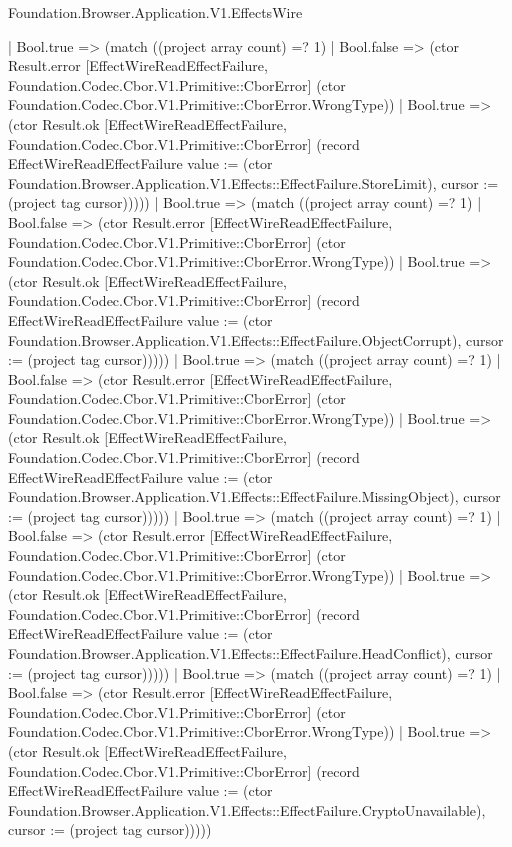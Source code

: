 \begin{lexlean}{Foundation.Browser.Application.V1.EffectsWire}
\begin{semanticmodule}
{                    | Bool.true => (match ((project array count) =? 1)
                      | Bool.false => (ctor Result.error [EffectWireReadEffectFailure, Foundation.Codec.Cbor.V1.Primitive::CborError] (ctor Foundation.Codec.Cbor.V1.Primitive::CborError.WrongType))
                      | Bool.true => (ctor Result.ok [EffectWireReadEffectFailure, Foundation.Codec.Cbor.V1.Primitive::CborError] (record EffectWireReadEffectFailure {value := (ctor Foundation.Browser.Application.V1.Effects::EffectFailure.StoreLimit), cursor := (project tag cursor)}))))
                  | Bool.true => (match ((project array count) =? 1)
                    | Bool.false => (ctor Result.error [EffectWireReadEffectFailure, Foundation.Codec.Cbor.V1.Primitive::CborError] (ctor Foundation.Codec.Cbor.V1.Primitive::CborError.WrongType))
                    | Bool.true => (ctor Result.ok [EffectWireReadEffectFailure, Foundation.Codec.Cbor.V1.Primitive::CborError] (record EffectWireReadEffectFailure {value := (ctor Foundation.Browser.Application.V1.Effects::EffectFailure.ObjectCorrupt), cursor := (project tag cursor)}))))
                | Bool.true => (match ((project array count) =? 1)
                  | Bool.false => (ctor Result.error [EffectWireReadEffectFailure, Foundation.Codec.Cbor.V1.Primitive::CborError] (ctor Foundation.Codec.Cbor.V1.Primitive::CborError.WrongType))
                  | Bool.true => (ctor Result.ok [EffectWireReadEffectFailure, Foundation.Codec.Cbor.V1.Primitive::CborError] (record EffectWireReadEffectFailure {value := (ctor Foundation.Browser.Application.V1.Effects::EffectFailure.MissingObject), cursor := (project tag cursor)}))))
              | Bool.true => (match ((project array count) =? 1)
                | Bool.false => (ctor Result.error [EffectWireReadEffectFailure, Foundation.Codec.Cbor.V1.Primitive::CborError] (ctor Foundation.Codec.Cbor.V1.Primitive::CborError.WrongType))
                | Bool.true => (ctor Result.ok [EffectWireReadEffectFailure, Foundation.Codec.Cbor.V1.Primitive::CborError] (record EffectWireReadEffectFailure {value := (ctor Foundation.Browser.Application.V1.Effects::EffectFailure.HeadConflict), cursor := (project tag cursor)}))))
            | Bool.true => (match ((project array count) =? 1)
              | Bool.false => (ctor Result.error [EffectWireReadEffectFailure, Foundation.Codec.Cbor.V1.Primitive::CborError] (ctor Foundation.Codec.Cbor.V1.Primitive::CborError.WrongType))
              | Bool.true => (ctor Result.ok [EffectWireReadEffectFailure, Foundation.Codec.Cbor.V1.Primitive::CborError] (record EffectWireReadEffectFailure {value := (ctor Foundation.Browser.Application.V1.Effects::EffectFailure.CryptoUnavailable), cursor := (project tag cursor)}))))
}
\end{semanticmodule}
\end{lexlean}
